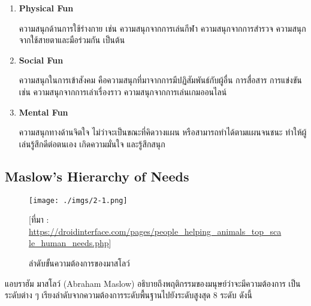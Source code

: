 \documentclass[12pt,oneside,openright,a4paper]{cpe-thai-project}
\begin{document}
\begin{enumerate}
  \item \textbf{Physical Fun}
  
  ความสนุกด้านการใช้ร่างกาย เช่น ความสนุกจากการเล่นกีฬา 
  ความสนุกจากการสำรวจ ความสนุกจากใช้สายตาและมือร่วมกัน เป็นต้น
  
  \item \textbf{Social Fun}
  
  ความสนุกในการเข้าสังคม คือความสนุกที่มาจากการมีปฏิสัมพันธ์กับผู้อื่น 
  การสื่อสาร การแข่งขัน เช่น ความสนุกจากการเล่าเรื่องราว 
  ความสนุกจากการเล่นเกมออนไลน์
  
  \item \textbf{Mental Fun}
  
  ความสนุกทางด้านจิตใจ ไม่ว่าจะเป็นขณะที่คิดวางแผน 
  หรือสามารถทำได้ตามแผนจนชนะ ทำให้ผู้เล่นรู้สึกดีต่อตนเอง 
  เกิดความมั่นใจ และรู้สึกสนุก
\end{enumerate}

\pagebreak
\subsection{Maslow’s Hierarchy of Needs\cite{maslow15}}

\begin{figure}[!h]\centering
\texttt{[image: ./imgs/2-1.png]}
\caption{ลำดับขั้นความต้องการของมาสโลว์}\label{fig:2-1}
\small [ที่มา : \url{https://droidinterface.com/pages/people_helping_animals_top_scale_human_needs.php}]
\end{figure}

แอบราฮัม มาสโลว์ (Abraham Maslow) อธิบายถึงพฤติกรรมของมนุษย์ว่าจะมีความต้องการ
เป็นระดับต่าง ๆ เรียงลำดับจากความต้องการระดับพื้นฐานไปยังระดับสูงสุด 8 ระดับ ดังนี้
\end{document}

